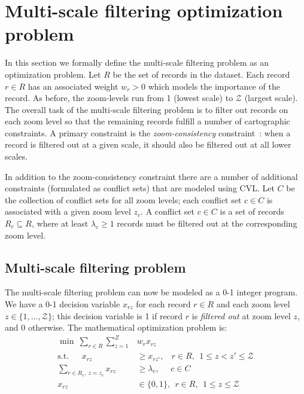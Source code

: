 \section{Multi-scale filtering optimization problem}
\label{sec:optimizationmodel}

In this section we formally define the multi-scale filtering problem as an optimization problem. Let $R$ be the set of records in the dataset. Each record $r \in R$ has an associated weight $w_r > 0$ which models the importance of the record. As before, the zoom-levels run from 1 (lowest scale) to $\mathcal{Z}$ (largest scale). The overall task of the multi-scale filtering problem is to filter out records on each zoom level so that the remaining records fulfill a number of cartographic constraints. A primary constraint is the \emph{zoom-consistency} constraint~\cite{fusiontables}: when a record is filtered out at a given scale, it should also be filtered out at all lower scales. 

In addition to the zoom-consistency constraint there are a number of additional constraints (formulated as conflict sets) that are modeled using CVL. Let $C$ be the collection of conflict sets for all zoom levels; each conflict set $c \in C$ is associated with a given zoom level $z_c$. A conflict set $c \in C$ is a set of records $R_c \subseteq R$, where at least $\lambda_c \geq 1$ records must be filtered out at the corresponding zoom level. 



\subsection{Multi-scale filtering problem}

The multi-scale filtering problem can now be modeled as a 0-1 integer program. We have a 0-1 decision variable $x_{rz}$ for each record $r \in R$ and each zoom level $z \in \{1,\ldots, \mathcal{Z}\}$; this decision variable is 1 if record $r$ is \emph{filtered out} at zoom level $z$, and 0 otherwise. The mathematical optimization problem is:
\begin{align}
  \label{eq:objective}
  \min ~\sum_{r \in R} \sum_{z=1}^Z &w_r x_{rz} \\
  \label{eq:zoom-consistency}
  \mbox{s.t.}~~~~~~~x_{rz} &\geq x_{rz'}, ~~~~r \in R, ~~1 \leq z < z' \leq \mathcal{Z} \\
  \label{eq:general-constraints}
  \sum_{r \in R_c, ~z = z_c} x_{rz} &\geq \lambda_c, ~~~~~~ c \in C \\
  x_{rz} & \in \{0, 1\}, ~~ r \in R, ~~1 \leq z \leq \mathcal{Z}
\end{align}

